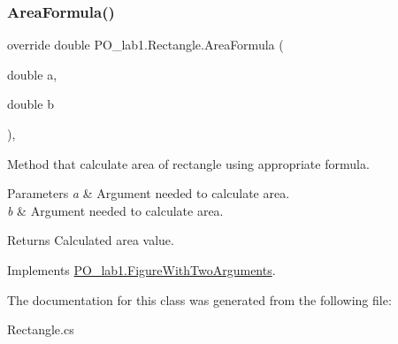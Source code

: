 \subsubsection{\texorpdfstring{Area\+Formula()}{AreaFormula()}}
{\footnotesize\ttfamily override double P\+O\+\_\+lab1.\+Rectangle.\+Area\+Formula (\begin{DoxyParamCaption}\item[{double}]{a,  }\item[{double}]{b }\end{DoxyParamCaption})\hspace{0.3cm}{\ttfamily [inline]}, {\ttfamily [virtual]}}



Method that calculate area of rectangle using appropriate formula. 


\begin{DoxyParams}{Parameters}
{\em a} & Argument needed to calculate area.\\
\hline
{\em b} & Argument needed to calculate area.\\
\hline
\end{DoxyParams}
\begin{DoxyReturn}{Returns}
Calculated area value.
\end{DoxyReturn}


Implements \mbox{\hyperlink{class_p_o__lab1_1_1_figure_with_two_arguments}{P\+O\+\_\+lab1.\+Figure\+With\+Two\+Arguments}}.



The documentation for this class was generated from the following file\+:\begin{DoxyCompactItemize}
\item 
Rectangle.\+cs\end{DoxyCompactItemize}
